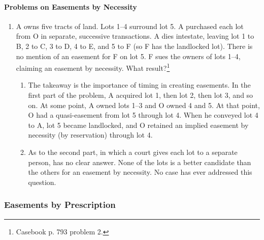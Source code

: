 \paragraph{Problems on Easements by Necessity}

\begin{enumerate}
    \item A owns five tracts of land. Lots 1--4 surround lot 5. A purchased 
    each lot from O in separate, successive transactions. A dies intestate, 
    leaving lot 1 to B, 2 to C, 3 to D, 4 to E, and 5 to F (so F has the 
    landlocked lot).  There is no mention of an easement for F on lot 5. F 
    sues the owners of lots 1--4, claiming an easement by necessity. What 
    result?\footnote{Casebook p. 793 problem 2.}
    \begin{enumerate}
        \item The takeaway is the importance of timing in 
        creating easements. In the first part of the problem, A acquired lot 
        1, then lot 2, then lot 3, and so on. At some point, A owned lots 1--3 
        and O owned 4 and 5. At that point, O had a quasi-easement from lot 5 
        through lot 4. When he conveyed lot 4 to A, lot 5 became landlocked, 
        and O retained an implied easement by necessity (by reservation) 
        through lot 4.
        \item As to the second part, in which a court gives each lot to a 
        separate person, has no clear answer. None of the lots is a better 
        candidate than the others for an easement by necessity. No case has 
        ever addressed this question.
    \end{enumerate}
\end{enumerate}

\subsubsection{Easements by Prescription}


